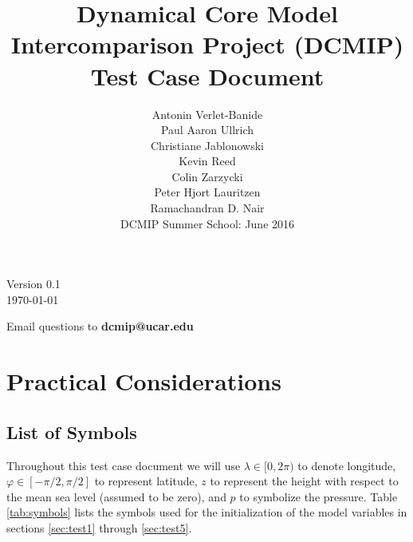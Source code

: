 \documentclass[times,doublespace]{fldauth}
\begin{document}
\setcounter{section}{-1}

\title{Dynamical Core Model Intercomparison Project (DCMIP) \\
 Test Case Document}
\author{Antonin Verlet-Banide\\ Paul Aaron Ullrich \\Christiane Jablonowski \\ Kevin Reed \\ Colin Zarzycki \\ Peter Hjort Lauritzen \\ Ramachandran D. Nair \\ \vspace{3cm} DCMIP Summer School: June 2016}

\maketitle

\begin{center}
Version 0.1 \\
\today
\end{center}

\vspace{2cm}

\begin{center}
Email questions to \textbf{dcmip@ucar.edu}
\end{center}

\clearpage

\section{Practical Considerations}

\subsection{List of Symbols}
Throughout this test case document we will use $\lambda \in [0, 2 \pi)$ to denote longitude, $\varphi \in [-\pi/2, \pi/2]$ to represent latitude, $z$ to represent the height with respect to the mean sea level (assumed to be zero), and $p$ to symbolize the pressure. Table \ref{tab:symbols} lists the symbols used for the initialization of the model variables in sections \ref{sec:test1} through \ref{sec:test5}. 
\end{document}
